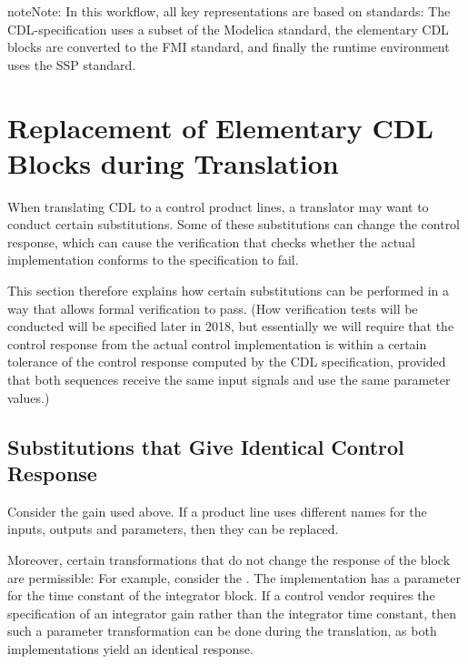 \documentclass[letterpaper,10pt, openany,english]{sphinxmanual}
\begin{document}
\begin{sphinxadmonition}{note}{Note:}
In this workflow, all key representations are based on standards:
The CDL-specification uses a subset of the Modelica standard,
the elementary CDL blocks are converted to the FMI standard,
and finally the runtime environment uses the SSP standard.
\end{sphinxadmonition}


\section{Replacement of Elementary CDL Blocks during Translation}
\label{\detokenize{codeGeneration:replacement-of-elementary-cdl-blocks-during-translation}}
When translating CDL to a control product lines, a translator may want to
conduct certain substitutions. Some of these substitutions can change the
control response, which can cause the verification that checks whether the
actual implementation conforms to the specification to fail.

This section therefore explains how certain substitutions can be performed
in a way that allows formal verification to pass.
(How verification tests will be conducted will be specified later in 2018, but
essentially we will require that the control response from the actual control
implementation is within a certain tolerance of the control response
computed by the CDL specification, provided that both sequences receive
the same input signals and use the same parameter values.)


\subsection{Substitutions that Give Identical Control Response}
\label{\detokenize{codeGeneration:substitutions-that-give-identical-control-response}}
Consider the gain  used above. If a product line
uses different names for the inputs, outputs and parameters, then they can
be replaced.

Moreover, certain transformations that do not change the
response of the block are permissible: For example, consider the
.
The implementation has a parameter
for the time constant of the integrator block.
If a control vendor requires the specification of an integrator gain rather than
the integrator time constant, then such a parameter transformation can be done during
the translation, as both implementations yield an identical response.
\end{document}
